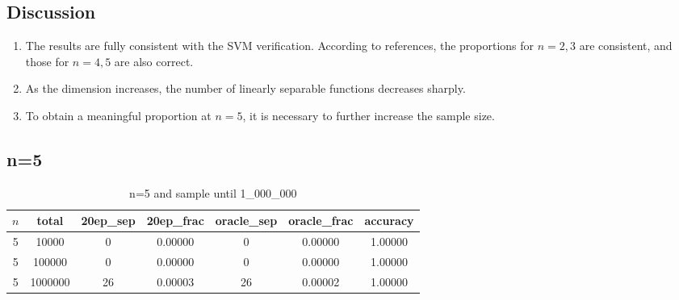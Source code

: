 \documentclass[11pt,a4paper]{article}
\begin{document}
\subsection{Discussion}
\begin{enumerate}
    \item The results are fully consistent with the SVM verification. According to references, the proportions for $n=2,3$ are consistent, and those for $n=4,5$ are also correct.
    \item As the dimension increases, the number of linearly separable functions decreases sharply.
    \item To obtain a meaningful proportion at $n=5$, it is necessary to further increase the sample size.
\end{enumerate}
\newpage
\subsection{n=5}
\begin{table}[h]
\centering
\begin{tabular}{ccccccc}
\toprule
$n$ & total & 20ep\_sep & 20ep\_frac & oracle\_sep & oracle\_frac & accuracy \\
\midrule
5 &    10000 &         0 & 0.00000 &         0 & 0.00000 & 1.00000 \\
5 &   100000 &         0 & 0.00000 &         0 & 0.00000 & 1.00000 \\
5 &  1000000 &        26 & 0.00003 &        26 & 0.00002 & 1.00000 \\
\bottomrule
\end{tabular}
\caption{n=5 and sample until 1\_000\_000}
\label{tab:results_n}
\end{table}

\end{document}
